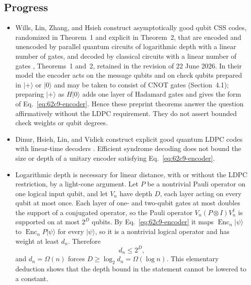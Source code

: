 \subsection*{Progress}

\begin{itemize}
  \item Wills, Lin, Zhang, and Hsieh construct asymptotically good qubit CSS
codes, randomized in Theorem~1 and explicit in Theorem~2, that are encoded and
unencoded by parallel quantum circuits of logarithmic depth with a linear
number of gates, and decoded by classical circuits with a linear number of
gates , Theorems~1 and~2, retained in the
revision of 22 June 2026.  In their model the encoder acts on the message
qubits and on check qubits prepared in $|+\rangle$ or $|0\rangle$ and may be
taken to consist of CNOT gates (Section~4.1); preparing $|+\rangle$ as
$H|0\rangle$ adds one layer of Hadamard gates and gives the form of
Eq.~\eqref{eq:62c9-encoder}.  Hence these preprint theorems answer the
question affirmatively without the LDPC requirement.  They do not assert
bounded check weights
or qubit degrees.

  \item Dinur, Hsieh, Lin, and Vidick construct explicit good quantum LDPC codes
with linear-time decoders .  Efficient
syndrome decoding does not bound the size or depth of a unitary encoder
satisfying Eq.~\eqref{eq:62c9-encoder}.

  \item Logarithmic depth is necessary for linear distance, with or without the
LDPC restriction, by a light-cone argument.  Let $P$ be a nontrivial Pauli
operator on one logical input qubit, and let $V_n$ have depth $D$, each layer
acting on every qubit at most once.  Each layer of one- and two-qubit gates at
most doubles the support of a conjugated operator, so the Pauli operator
$V_n(P\otimes I)V_n^\dagger$ is supported on at most $2^D$ qubits.  By
Eq.~\eqref{eq:62c9-encoder} it maps $\operatorname{Enc}_n|\psi\rangle$ to
$\operatorname{Enc}_nP|\psi\rangle$ for every $|\psi\rangle$, so it is a
nontrivial logical operator and has weight at least $d_n$.  Therefore
\begin{equation}
  d_n\le 2^{D},
  \label{eq:62c9-light-cone}
\end{equation}
and $d_n=\Omega(n)$ forces $D\ge\log_2 d_n=\Omega(\log n)$.  This elementary
deduction shows that the depth bound in the statement cannot be lowered to a
constant.
\end{itemize}

